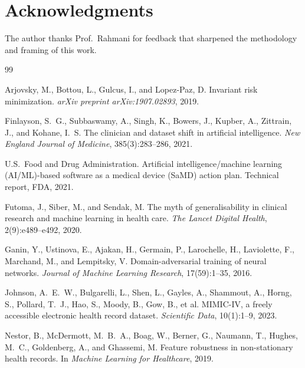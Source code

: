 \documentclass{article}
\begin{document}
\section*{Acknowledgments}
The author thanks Prof.\ Rahmani for feedback that sharpened the methodology and framing of this work.

{\small

\begin{thebibliography}{99}

Arjovsky, M., Bottou, L., Gulcus, I., and Lopez-Paz, D.
\newblock Invariant risk minimization.
\newblock \emph{arXiv preprint arXiv:1907.02893}, 2019.

Finlayson, S.~G., Subbaswamy, A., Singh, K., Bowers, J., Kupber, A., Zittrain, J., and Kohane, I.~S.
\newblock The clinician and dataset shift in artificial intelligence.
\newblock \emph{New England Journal of Medicine}, 385(3):283--286, 2021.

U.S.\ Food and Drug Administration.
\newblock Artificial intelligence/machine learning (AI/ML)-based software as a medical device (SaMD) action plan.
\newblock Technical report, FDA, 2021.

Futoma, J., Siber, M., and Sendak, M.
\newblock The myth of generalisability in clinical research and machine learning in health care.
\newblock \emph{The Lancet Digital Health}, 2(9):e489--e492, 2020.

Ganin, Y., Ustinova, E., Ajakan, H., Germain, P., Larochelle, H., Laviolette, F., Marchand, M., and Lempitsky, V.
\newblock Domain-adversarial training of neural networks.
\newblock \emph{Journal of Machine Learning Research}, 17(59):1--35, 2016.

Johnson, A.~E.~W., Bulgarelli, L., Shen, L., Gayles, A., Shammout, A., Horng, S., Pollard, T.~J., Hao, S., Moody, B., Gow, B., et al.
\newblock MIMIC-IV, a freely accessible electronic health record dataset.
\newblock \emph{Scientific Data}, 10(1):1--9, 2023.

Nestor, B., McDermott, M.~B.~A., Boag, W., Berner, G., Naumann, T., Hughes, M.~C., Goldenberg, A., and Ghassemi, M.
\newblock Feature robustness in non-stationary health records.
\newblock In \emph{Machine Learning for Healthcare}, 2019.


\end{thebibliography}}
\end{document}
